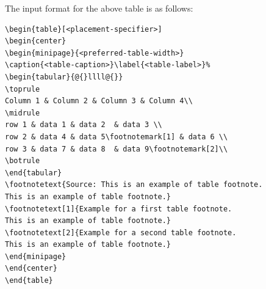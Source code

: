 \documentclass[sn-mathphys]{sn-jnl}%
\theoremstyle{thmstyleone}%
\theoremstyle{thmstyletwo}%
\theoremstyle{thmstylethree}%
\begin{document}
\noindent
The input format for the above table is as follows:

\bigskip
\begin{verbatim}
\begin{table}[<placement-specifier>]
\begin{center}
\begin{minipage}{<preferred-table-width>}
\caption{<table-caption>}\label{<table-label>}%
\begin{tabular}{@{}llll@{}}
\toprule
Column 1 & Column 2 & Column 3 & Column 4\\
\midrule
row 1 & data 1 & data 2	 & data 3 \\
row 2 & data 4 & data 5\footnotemark[1] & data 6 \\
row 3 & data 7 & data 8	 & data 9\footnotemark[2]\\
\botrule
\end{tabular}
\footnotetext{Source: This is an example of table footnote. 
This is an example of table footnote.}
\footnotetext[1]{Example for a first table footnote.
This is an example of table footnote.}
\footnotetext[2]{Example for a second table footnote. 
This is an example of table footnote.}
\end{minipage}
\end{center}
\end{table}
\end{verbatim}
\bigskip
\end{document}
